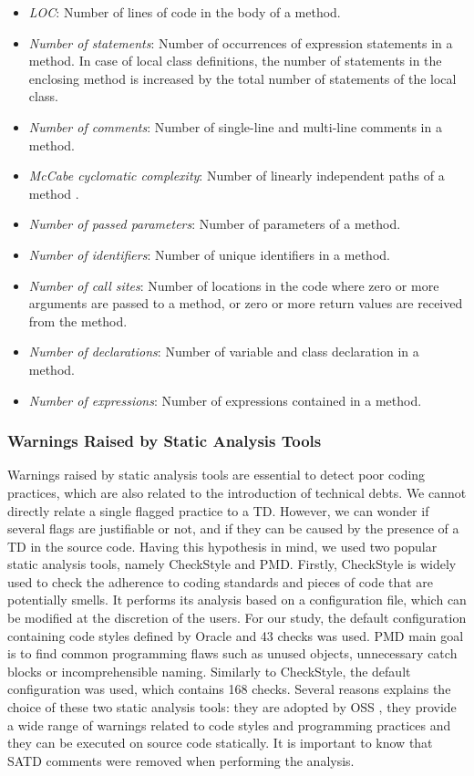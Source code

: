 \begin{itemize}
\item \textit{LOC}: Number of lines of code in the body of a method. %
\item \textit{Number of statements}: Number of occurrences of expression statements in a method. In case of local class definitions, the number of statements in the enclosing method is increased by the total number of statements of the local class.
\item \textit{Number of comments}: Number of single-line and multi-line comments in a method.
\item \textit{McCabe cyclomatic complexity}: Number of linearly independent paths of a method \citep{mccabe90}.
\item \textit{Number of passed parameters}: Number of parameters of a method.
\item \textit{Number of identifiers}: Number of unique identifiers in a method.
\item \textit{Number of call sites}: Number of locations in the code where zero or more arguments are passed to a method, or zero or more return values are received from the method.
\item \textit{Number of declarations}: Number of variable and class declaration in a method.
\item \textit{Number of expressions}: Number of expressions contained in a method.
\end{itemize}

\subsubsection{Warnings Raised by Static Analysis Tools}

Warnings raised by static analysis tools are essential to detect poor coding practices, which are also related to the introduction of technical debts. We cannot directly relate a single flagged practice to a \ac{TD}. However, we can wonder if several flags are justifiable or not, and if they can be caused by the presence of a \ac{TD} in the source code. Having this hypothesis in mind, we used two popular static analysis tools, namely CheckStyle and PMD. Firstly, CheckStyle \citep{checkstyle} is widely used to check the adherence to coding standards and pieces of code that are potentially smells. It performs its analysis based on a configuration file, which can be modified at the discretion of the users. For our study, the default configuration containing code styles defined by Oracle and 43 checks was used. PMD \citep{pmd} main goal is to find common programming flaws such as unused objects, unnecessary catch blocks or incomprehensible naming. Similarly to CheckStyle, the default configuration was used, which contains 168 checks. Several reasons explains the choice of these two static analysis tools: they are adopted by \ac{OSS} \citep{BellerBMZ16}, they provide a wide range of warnings related to code styles and programming practices and they can be executed on source code statically. It is important to know that \ac{SATD} comments were removed when performing the analysis.

